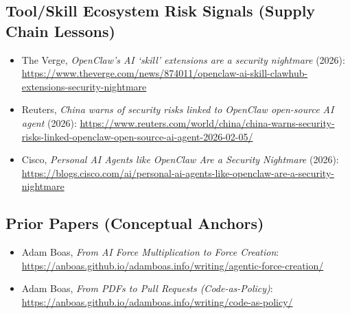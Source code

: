\documentclass[11pt]{article}
\begin{document}
\hypertarget{toolskill-ecosystem-risk-signals-supply-chain-lessons}{%
\subsection{Tool/Skill Ecosystem Risk Signals (Supply Chain Lessons)}\label{toolskill-ecosystem-risk-signals-supply-chain-lessons}}

\begin{itemize}
\tightlist
\item
  The Verge, \emph{OpenClaw's AI `skill' extensions are a security
  nightmare} (2026):
  \url{https://www.theverge.com/news/874011/openclaw-ai-skill-clawhub-extensions-security-nightmare}\\
\item
  Reuters, \emph{China warns of security risks linked to OpenClaw
  open-source AI agent} (2026):
  \url{https://www.reuters.com/world/china/china-warns-security-risks-linked-openclaw-open-source-ai-agent-2026-02-05/}\\
\item
  Cisco, \emph{Personal AI Agents like OpenClaw Are a Security
  Nightmare} (2026):
  \url{https://blogs.cisco.com/ai/personal-ai-agents-like-openclaw-are-a-security-nightmare}
\end{itemize}

\hypertarget{prior-papers-conceptual-anchors}{%
\subsection{Prior Papers (Conceptual Anchors)}\label{prior-papers-conceptual-anchors}}

\begin{itemize}
\tightlist
\item
  Adam Boas, \emph{From AI Force Multiplication to Force Creation}:
  \url{https://anboas.github.io/adamboas.info/writing/agentic-force-creation/}\\
\item
  Adam Boas, \emph{From PDFs to Pull Requests (Code-as-Policy)}:
  \url{https://anboas.github.io/adamboas.info/writing/code-as-policy/}
\end{itemize}
\end{document}
